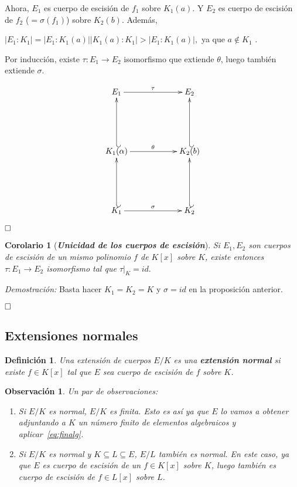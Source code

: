 \documentclass[12pt]{article}
\newtheorem{definition}[theorem]{Definición}
\newtheorem{corolario}{Corolario}[theorem]
\newtheorem{observation}{Observación}[theorem]
\begin{document}
Ahora, $E_{1}$ es cuerpo de escisión de $f_{1}$ sobre $K_{1}(a)$. Y $E_{2}$ es cuerpo de escisión de $f_{2}$ ($= \sigma(f_{1})$) sobre $K_{2}(b)$. Además, \begin{center}$|E_{1} : K_{1}| = |E_{1} : K_{1}(a)| |K_{1}(a) : K_{1} | > |E_{1}:K_{1}(a)|,$ ya que $a \notin K_{1}$ .\end{center}

Por inducción, existe $\tau \colon E_{1} \longrightarrow E_{2}$ isomorfismo que extiende $\theta$, luego también extiende $\sigma$. 

$$\xymatrix @=2cm {E_{1}\ar[r]^{\tau} & E_{2} \\ K_{1}(\alpha)\ar[r]^{\theta} \ar@{_(->}[u] & K_{2}(b) \ar@{_(->}[u] \\ K_{1} \ar[r]^{\sigma} \ar@{_(->}[u] & K_{2} \ar@{_(->}[u]  }$$

$\hfill \square$

\begin{corolario}[\textbf{\textit{Unicidad de los cuerpos de escisión}}] \label{eq:unicuer} Si $E_{1}, E_{2}$ son cuerpos de escisión de un mismo polinomio $f$ de $K[x]$ sobre $K$, existe entonces $\tau \colon E_{1} \longrightarrow E_{2}$ isomorfismo tal que $\left.\tau \right|_{K} = id.$
\end{corolario}
\emph{Demostración: } Basta hacer $K_{1} = K_{2} = K$ y $\sigma = id$ en la proposición anterior.

$\hfill \square$

\subsection{Extensiones normales}

\begin{definition} Una extensión de cuerpos $E/K$ es una \textbf{extensión normal} si existe $f \in K[x]$ tal que $E$ sea cuerpo de escisión de $f$ sobre $K$.
\end{definition}

\begin{observation}Un par de observaciones: \begin{enumerate}
\item Si $E/K$ es normal, $E/K$ es finita. Esto es así ya que $E$ lo vamos a obtener adjuntando a $K$ un número finito de elementos algebraicos y aplicar~\ref{eq:finalg}.
\item Si $E/K$ es normal y $K \subseteq L \subseteq E$, $E/L$ también es normal. En este caso, ya que $E$ es cuerpo de escisión de un $f \in K[x]$ sobre $K$, luego también es cuerpo de escisión de $f \in L[x]$ sobre $L$.
\end{enumerate}
\end{observation}
\end{document}
